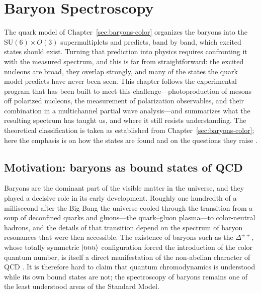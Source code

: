 \section{Baryon Spectroscopy}
\label{sec:baryon-spectroscopy}

The quark model of Chapter~\ref{sec:baryons-color} organizes the baryons into the
$\mathrm{SU}(6)\times O(3)$ supermultiplets and predicts, band by band, which excited
states should exist. Turning that prediction into physics requires confronting it with the
measured spectrum, and this is far from straightforward: the excited nucleons are broad,
they overlap strongly, and many of the states the quark model predicts have never been
seen. This chapter follows the experimental program that has been built to meet this
challenge---photoproduction of mesons off polarized nucleons, the measurement of
polarization observables, and their combination in a multichannel partial wave
analysis---and summarizes what the resulting spectrum has taught us, and where it still
resists understanding. The theoretical classification is taken as established from
Chapter~\ref{sec:baryons-color}; here the emphasis is on how the states are found and on
the questions they raise \cite[Ch.~15]{Amsler2018}.

\subsection{Motivation: baryons as bound states of QCD}
\label{subsec:why-baryons}

Baryons are the dominant part of the visible matter in the universe, and they played a
decisive role in its early development. Roughly one hundredth of a millisecond after the
Big Bang the universe cooled through the transition from a soup of deconfined quarks and
gluons---the quark--gluon plasma---to color-neutral hadrons, and the details of that
transition depend on the spectrum of baryon resonances that were then accessible. The
existence of baryons such as the $\Delta^{++}$, whose totally symmetric $\ket{uuu}$
configuration forced the introduction of the color quantum number, is itself a direct
manifestation of the non-abelian character of QCD \cite[Ch.~13]{Amsler2018}. It is
therefore hard to claim that quantum chromodynamics is understood while its own bound
states are not; the spectroscopy of baryons remains one of the least understood areas of
the Standard Model.

